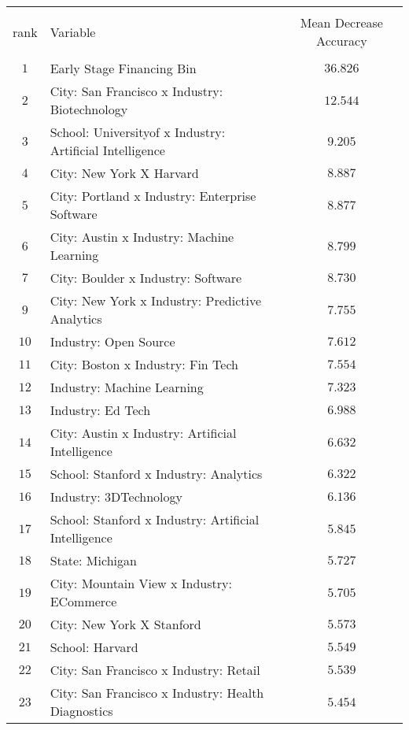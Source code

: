 
\begin{tabular}{@{\extracolsep{5pt}} clc} 
\\[-1.8ex]\hline 
\hline \\[-1.8ex] 
rank & Variable & Mean Decrease Accuracy \\ 
\hline \\[-1.8ex] 
$1$ & Early Stage Financing Bin & $36.826$ \\ 
$2$ & City: San Francisco x Industry: Biotechnology & $12.544$ \\ 
$3$ & School: Universityof x Industry: Artificial Intelligence & $9.205$ \\ 
$4$ & City: New York X Harvard & $8.887$ \\ 
$5$ & City: Portland x Industry: Enterprise Software & $8.877$ \\ 
$6$ & City: Austin x Industry: Machine Learning & $8.799$ \\ 
$7$ & City: Boulder x Industry: Software & $8.730$ \\ 
$9$ & City: New York x Industry: Predictive Analytics & $7.755$ \\ 
$10$ & Industry: Open Source & $7.612$ \\ 
$11$ & City: Boston x Industry: Fin Tech & $7.554$ \\ 
$12$ & Industry: Machine Learning & $7.323$ \\ 
$13$ & Industry: Ed Tech & $6.988$ \\ 
$14$ & City: Austin x Industry: Artificial Intelligence & $6.632$ \\ 
$15$ & School: Stanford x Industry: Analytics & $6.322$ \\ 
$16$ & Industry: 3DTechnology & $6.136$ \\ 
$17$ & School: Stanford x Industry: Artificial Intelligence & $5.845$ \\ 
$18$ & State: Michigan & $5.727$ \\ 
$19$ & City: Mountain View x Industry: ECommerce & $5.705$ \\ 
$20$ & City: New York X Stanford & $5.573$ \\ 
$21$ & School: Harvard & $5.549$ \\ 
$22$ & City: San Francisco x Industry: Retail & $5.539$ \\ 
$23$ & City: San Francisco x Industry: Health Diagnostics & $5.454$ \\ 

\end{tabular}
